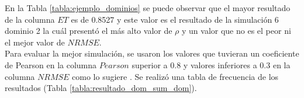 \begin{landscape}
\begin{longtable}{rrrrrrrrrrr}
\end{longtable}


\end{landscape}

En la Tabla \ref{tabla:ejemplo_dominios} se puede observar que el mayor resultado de la columna $ET$ es de 0.8527 y este valor es el resultado de la simulación 6 dominio 2 la cuál presentó el más alto valor de $\rho$ y un valor que no es el peor ni el mejor valor de $NRMSE$.\\

Para evaluar la mejor simulación, se usaron los valores que tuvieran un coeficiente de Pearson en la columna  $Pearson$ superior a 0.8 y valores inferiores a 0.3 en la columna $NRMSE$ como lo sugiere \citet{Agua2016}. Se realizó una tabla de frecuencia de los resultados (Tabla \ref{tabla:resultado_dom_sum_dom}).\\


%
%         
%



